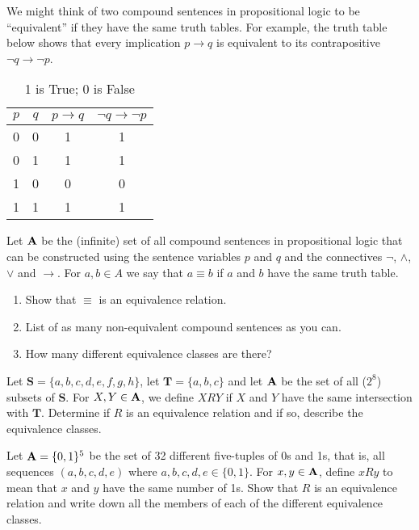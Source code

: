 \begin{prb}
We might think of two compound sentences in propositional logic to be ``equivalent'' if they have the same truth tables.  For example, the truth table below shows that every implication $p\rightarrow q$ is equivalent to its contrapositive $\lnot q \rightarrow \lnot p$.

\begin{table}[H]
\begin{center}
\begin{tabular}{||c|c||c|c||}
\hline
$p$ & $q$ & $p\rightarrow q$ & $\lnot q \rightarrow \lnot p$ \\ \hline
 0  &  0  &        1         &               1               \\ \hline
 0  &  1  &        1         &               1               \\ \hline
 1  &  0  &        0         &               0               \\ \hline
 1  &  1  &        1         &               1               \\ \hline
\end{tabular}
\caption{1 is True; 0 is False}
\end{center}
\end{table}
Let $\mathbf A$ be the (infinite) set of all compound sentences in propositional logic that can be constructed using the sentence variables $p$ and $q$ and the connectives $\lnot$, $\land$, $\lor$ and $\rightarrow$. For $a,b \in A$ we say that $a\equiv b$ if $a$ and $b$ have the same truth table.
\begin{enumerate}
\item Show that $\equiv$ is an equivalence relation.
\item List of as many non-equivalent compound sentences as you can.
\item How many different equivalence classes are there?
\end{enumerate}
\end{prb}

\begin{prb}
Let $\mathbf S = \{a,b,c,d,e,f,g,h\}$, let  $\mathbf T = \{a,b,c\}$ and let  $\mathbf A$ be the set of all ($2^8$) subsets of $\mathbf S$.   For  $X,Y \in \mathbf A$,  we define $X R Y$ if $X$  and $Y$  have the same intersection with $\mathbf T$. Determine if $R$ is an equivalence relation and if so, describe the equivalence classes.
\end{prb}

\begin{prb}
Let $\mathbf A = \{0,1\}^5$ be the set of 32 different five-tuples of 0s and 1s, that is, all sequences $(a,b,c,d,e)$ where $a,b,c,d,e\in\{0,1\}$.  For $x,y \in \mathbf A$, define $x R y$ to mean that $x$ and $y$ have the same number of 1s.  Show that $R$ is an equivalence relation and write down all the members of each of the different equivalence classes.
\end{prb}

